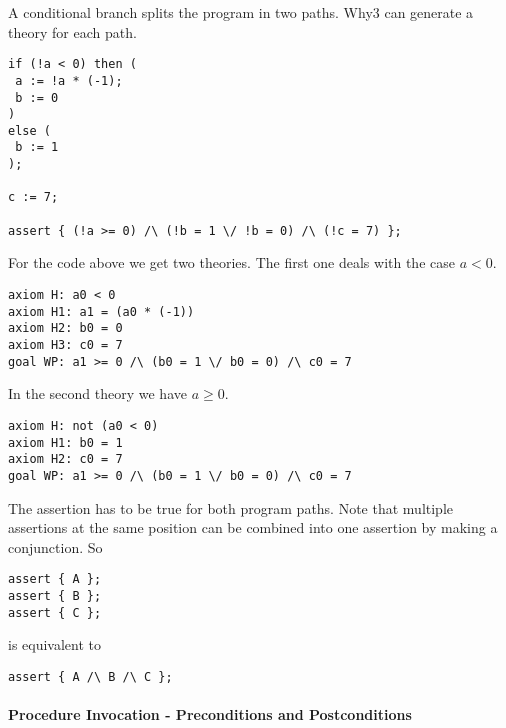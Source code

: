 A conditional branch splits the program in two paths. Why3 can generate a
theory for each path.
\begin{lstlisting}
if (!a < 0) then (
 a := !a * (-1);
 b := 0
)
else (
 b := 1
);

c := 7;

assert { (!a >= 0) /\ (!b = 1 \/ !b = 0) /\ (!c = 7) };
\end{lstlisting}
For the code above we get two theories. The first one deals with the case
$a < 0$.
\begin{lstlisting}
axiom H: a0 < 0
axiom H1: a1 = (a0 * (-1))
axiom H2: b0 = 0
axiom H3: c0 = 7
goal WP: a1 >= 0 /\ (b0 = 1 \/ b0 = 0) /\ c0 = 7
\end{lstlisting}
In the second theory we have $a \geq 0$.
\begin{lstlisting}
axiom H: not (a0 < 0)
axiom H1: b0 = 1
axiom H2: c0 = 7
goal WP: a1 >= 0 /\ (b0 = 1 \/ b0 = 0) /\ c0 = 7
\end{lstlisting}
The assertion has to be true for both program paths. 
Note that multiple assertions at the same position can be combined
into one assertion by making a conjunction.
So
\begin{lstlisting}
assert { A };
assert { B };
assert { C };
\end{lstlisting}
is equivalent to 
\begin{lstlisting}
assert { A /\ B /\ C };
\end{lstlisting}

\paragraph{Procedure Invocation - Preconditions and Postconditions}

